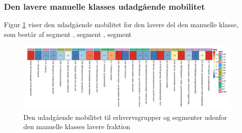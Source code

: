 \begin{landscape}


%
\subsubsection{Den lavere manuelle klasses udadgående mobilitet}
%


Figur \ref{fig delanalyse3 manuelklasselav without.mob disco} viser den udadgående mobilitet for den lavere del den manuelle klasse, som består af segment , segment , segment 

\begin{figure}[H]
\begin{centering}
\caption[Manuel klasse,lavere: Mobilitet til erhvervsgrupper og segmenter udenfor klassefraktionen]{Den udadgående mobilitet til erhvervsgrupper og segmenter udenfor den manuelle klasses lavere fraktion}
\label{fig delanalyse3 manuelklasselav without.mob disco}
  \includegraphics[width=\paperwidth]{fig/ma_motor/manuel_seg_lav.png}
\end{centering}
\end{figure}


\end{landscape}
